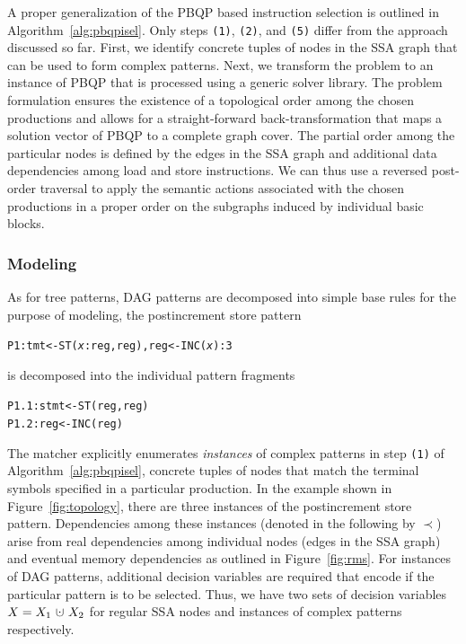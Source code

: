 A proper generalization of the PBQP based instruction selection
\cite{Ebner08} is outlined in Algorithm~\ref{alg:pbqpisel}. Only steps
\texttt{(1)}, \texttt{(2)}, and \texttt{(5)} differ from the approach
discussed so far. First, we identify concrete tuples of nodes in the
SSA graph that can be used to form complex patterns. Next, we
transform the problem to an instance of PBQP that is processed using a
generic solver library. The problem formulation ensures the existence
of a topological order among the chosen productions and allows for a
straight-forward back-transformation that maps a solution vector of
PBQP to a complete graph cover. The partial order among the particular
nodes is defined by the edges in the SSA graph and additional data
dependencies among load and store instructions.  We can thus use a
reversed post-order traversal to apply the semantic actions associated
with the chosen productions in a proper order on the subgraphs induced
by individual basic blocks.

\subsubsection{Modeling}
As for tree patterns, DAG patterns are decomposed into simple base
rules for the purpose of modeling, \eg the postincrement store
pattern
\begin{alltt}
  P1: tmt <- ST(\textit{x}:reg, reg), reg <- INC(\textit{x}) : 3
\end{alltt}
is decomposed into the individual pattern fragments
\begin{alltt}
  P1.1: stmt <- ST(reg, reg)
  P1.2: reg  <- INC(reg)
\end{alltt}
The matcher explicitly enumerates \emph{instances\/} of complex
patterns in step \texttt{(1)} of Algorithm~\ref{alg:pbqpisel}, \ie
concrete tuples of nodes that match the terminal symbols specified in
a particular production. In the example shown in
Figure~\ref{fig:topology}, there are three instances of the
postincrement store pattern. Dependencies among these instances
(denoted in the following by $\prec$) arise from real dependencies
among individual nodes (edges in the SSA graph) and eventual memory
dependencies as outlined in Figure~\ref{fig:rms}.
For instances of DAG patterns, additional decision variables are
required that encode if the particular pattern is to be
selected. Thus, we have two sets of decision variables
$X=X_1~\dotcup~X_2$ for regular SSA nodes and instances of complex
patterns respectively.

